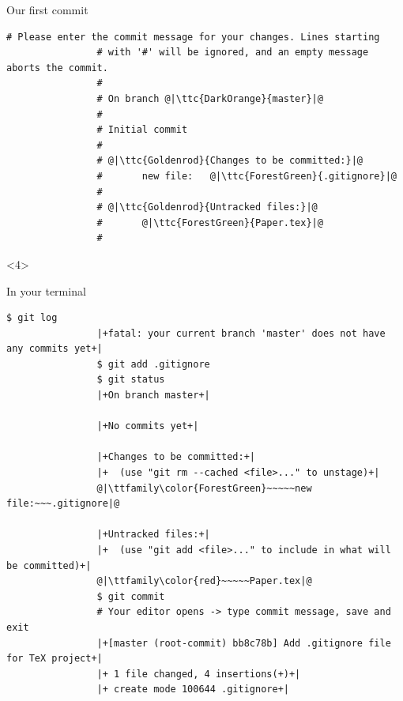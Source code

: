 \documentclass[usenames,svgnames,14pt]{beamer}
\newcommand{\ttc}[2]{\texttt{\textcolor{#1}{#2}}}
\begin{document}
\begin{frame}[fragile]{Our first commit}
\begin{overlayarea}{\textwidth}{0.7\textheight}
\begin{onlyenv}
\begin{lstlisting}[style=MyBash, aboveskip=2mm, xleftmargin=-3mm, xrightmargin=-3mm]
                # Please enter the commit message for your changes. Lines starting
                # with '#' will be ignored, and an empty message aborts the commit.
                #
                # On branch @|\ttc{DarkOrange}{master}|@
                #
                # Initial commit
                #
                # @|\ttc{Goldenrod}{Changes to be committed:}|@
                #       new file:   @|\ttc{ForestGreen}{.gitignore}|@
                #
                # @|\ttc{Goldenrod}{Untracked files:}|@
                #       @|\ttc{ForestGreen}{Paper.tex}|@
                #
            \end{lstlisting}
        \end{onlyenv}
        \begin{onlyenv}<4>
            \centerline{In your terminal}
            \begin{lstlisting}[style=MyBash, aboveskip=2mm, xleftmargin=-2mm, xrightmargin=-2mm]
                $ git log
                |+fatal: your current branch 'master' does not have any commits yet+|
                $ git add .gitignore
                $ git status
                |+On branch master+|

                |+No commits yet+|

                |+Changes to be committed:+|
                |+  (use "git rm --cached <file>..." to unstage)+|
                @|\ttfamily\color{ForestGreen}~~~~~new file:~~~.gitignore|@

                |+Untracked files:+|
                |+  (use "git add <file>..." to include in what will be committed)+|
                @|\ttfamily\color{red}~~~~~Paper.tex|@
                $ git commit
                # Your editor opens -> type commit message, save and exit
                |+[master (root-commit) bb8c78b] Add .gitignore file for TeX project+|
                |+ 1 file changed, 4 insertions(+)+|
                |+ create mode 100644 .gitignore+|
            \end{lstlisting}
        \end{onlyenv}
    \end{overlayarea}
\end{frame}
\end{document}
